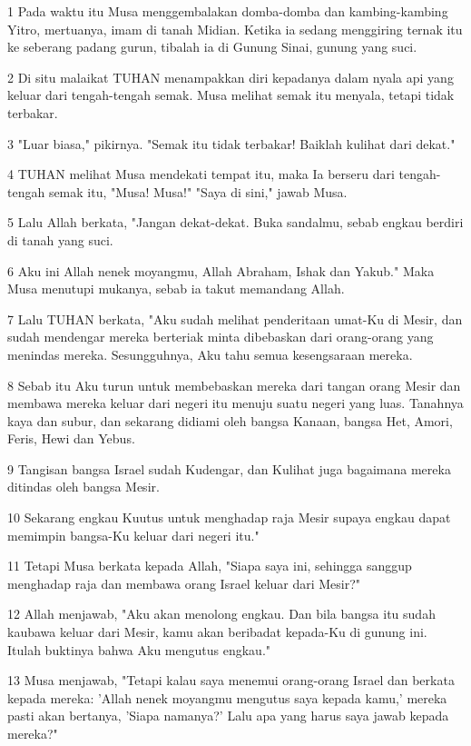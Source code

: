 \par 1 Pada waktu itu Musa menggembalakan domba-domba dan kambing-kambing Yitro, mertuanya, imam di tanah Midian. Ketika ia sedang menggiring ternak itu ke seberang padang gurun, tibalah ia di Gunung Sinai, gunung yang suci.
\par 2 Di situ malaikat TUHAN menampakkan diri kepadanya dalam nyala api yang keluar dari tengah-tengah semak. Musa melihat semak itu menyala, tetapi tidak terbakar.
\par 3 "Luar biasa," pikirnya. "Semak itu tidak terbakar! Baiklah kulihat dari dekat."
\par 4 TUHAN melihat Musa mendekati tempat itu, maka Ia berseru dari tengah-tengah semak itu, "Musa! Musa!" "Saya di sini," jawab Musa.
\par 5 Lalu Allah berkata, "Jangan dekat-dekat. Buka sandalmu, sebab engkau berdiri di tanah yang suci.
\par 6 Aku ini Allah nenek moyangmu, Allah Abraham, Ishak dan Yakub." Maka Musa menutupi mukanya, sebab ia takut memandang Allah.
\par 7 Lalu TUHAN berkata, "Aku sudah melihat penderitaan umat-Ku di Mesir, dan sudah mendengar mereka berteriak minta dibebaskan dari orang-orang yang menindas mereka. Sesungguhnya, Aku tahu semua kesengsaraan mereka.
\par 8 Sebab itu Aku turun untuk membebaskan mereka dari tangan orang Mesir dan membawa mereka keluar dari negeri itu menuju suatu negeri yang luas. Tanahnya kaya dan subur, dan sekarang didiami oleh bangsa Kanaan, bangsa Het, Amori, Feris, Hewi dan Yebus.
\par 9 Tangisan bangsa Israel sudah Kudengar, dan Kulihat juga bagaimana mereka ditindas oleh bangsa Mesir.
\par 10 Sekarang engkau Kuutus untuk menghadap raja Mesir supaya engkau dapat memimpin bangsa-Ku keluar dari negeri itu."
\par 11 Tetapi Musa berkata kepada Allah, "Siapa saya ini, sehingga sanggup menghadap raja dan membawa orang Israel keluar dari Mesir?"
\par 12 Allah menjawab, "Aku akan menolong engkau. Dan bila bangsa itu sudah kaubawa keluar dari Mesir, kamu akan beribadat kepada-Ku di gunung ini. Itulah buktinya bahwa Aku mengutus engkau."
\par 13 Musa menjawab, "Tetapi kalau saya menemui orang-orang Israel dan berkata kepada mereka: 'Allah nenek moyangmu mengutus saya kepada kamu,' mereka pasti akan bertanya, 'Siapa namanya?' Lalu apa yang harus saya jawab kepada mereka?"
